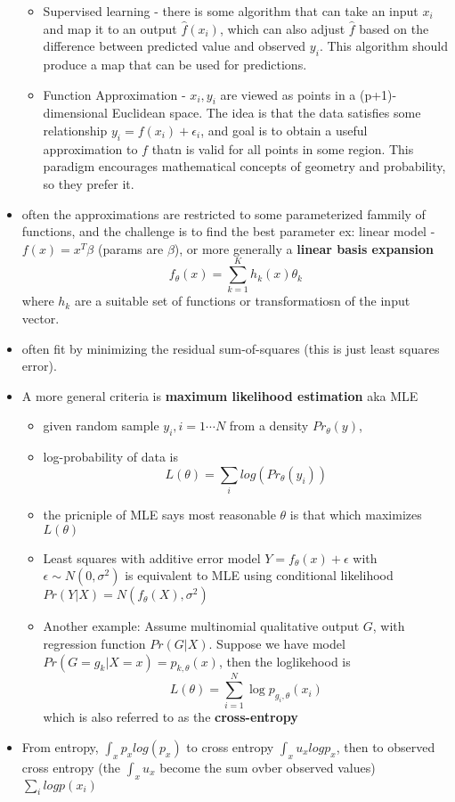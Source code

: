 \documentclass[a4paper]{report}
\newcommand{\gray}{\color{gray}}
\newcommand{\<}{\textless}
\renewcommand{\>}{\textgreater}
\begin{document}
\begin{itemize}
    \begin{itemize}
      \item Supervised learning - there is some algorithm that can take an input $x_i$ and map it to an output $\hat{f}(x_i)$, which can also adjust $\hat{f}$ based on the difference between predicted value and observed $y_i$. This algorithm should produce a map that can be used for predictions.
      \item Function Approximation - ${x_i, y_i}$ are viewed as points in a (p+1)-dimensional Euclidean space. The idea is that the data satisfies some relationship $ y_i = f(x_i) + \epsilon_i$, and goal is to obtain a useful approximation to $f$ thatn is valid for all points in some region.
	\subitem This paradigm encourages mathematical concepts of geometry and probability, so they prefer it.
    \end{itemize}
  \item often the approximations are restricted to some parameterized fammily of functions, and the challenge is to find the best parameter
    \subitem ex: linear model - $f(x) = x^T\beta$ (params are $\beta$), or more generally a {\bf linear basis expansion}
    $$f_\theta(x) = \sum_{k=1}^{K} h_k(x)\theta_k $$
    where $h_k$ are a suitable set of functions or transformatiosn of the input vector.
  \item often fit by minimizing the residual sum-of-squares (this is just least squares error).
  \item A more general criteria is {\bf maximum likelihood estimation} aka MLE	
    \begin{itemize}
      \item given random sample $y_i, i=1\cdots N$ from a density $Pr_\theta(y)$,
      \item log-probability of data is 
	$$ L(\theta) = \sum_i log(Pr_\theta(y_i)) $$
      \item the pricniple of MLE says most reasonable $\theta$ is that which maximizes $L(\theta)$
      \item Least squares with additive error model $Y = f_\theta(x) + \epsilon$ with $\epsilon \sim N(0, \sigma^2)$ is equivalent to MLE using conditional likelihood $Pr(Y | X) = N(f_\theta(X), \sigma^2)$
      \item Another example: Assume multinomial qualitative output $G$, with regression function $Pr(G|X)$. Suppose we have model $Pr(G = g_k | X = x) = p_{k,\theta}(x)$, then the loglikehood is
	$$ L(\theta) = \sum_{i=1}^N \log p_{g_i, \theta}(x_i) $$
	which is also referred to as the {\bf cross-entropy}
    \end{itemize}
  \item {\gray From entropy, $\int_x p_x log(p_x)$ to cross entropy $\int_x u_x log p_x$, then to observed cross entropy (the $\int_x u_x$ become the sum ovber observed values) $\sum_i log p(x_i)$}
\end{itemize}	
\end{document}
